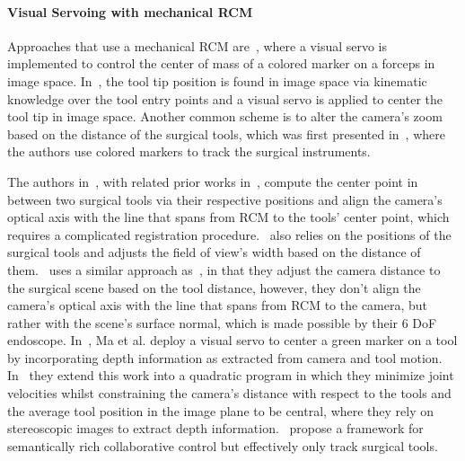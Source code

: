 \paragraph{Visual Servoing with mechanical RCM}
Approaches that use a mechanical RCM are~\cite{omote1999self}, where a visual servo is implemented to control the center of mass of a colored marker on a forceps in image space. In~\cite{agustinos2014visual, voros2007automatic}, the tool tip position is found in image space via kinematic knowledge over the tool entry points and a visual servo is applied to center the tool tip in image space. Another common scheme is to alter the camera's zoom based on the distance of the surgical tools, which was first presented in~\cite{king2013towards}, where the authors use colored markers to track the surgical instruments.

The authors in~\cite{eslamian2020development, mariani2020experimental, da2020scan}, with related prior works in~\cite{Eslamian2016TowardsTI, eslamian2017autonomous}, compute the center point in between two surgical tools via their respective positions and align the camera's optical axis with the line that spans from RCM to the tools' center point, which requires a complicated registration procedure.~\cite{yu2016automatic} also relies on the positions of the surgical tools and adjusts the field of view's width based on the distance of them.~\cite{abdelaal2020orientation} uses a similar approach as~\cite{eslamian2020development}, in that they adjust the camera distance to the surgical scene based on the tool distance, however, they don't align the camera's optical axis with the line that spans from RCM to the camera, but rather with the scene's surface normal, which is made possible by their 6 DoF endoscope. In~\cite{ma2019autonomous}, Ma et al. deploy a visual servo to center a green marker on a tool by incorporating depth information as extracted from camera and tool motion. In~\cite{ma2020visual} they extend this work into a quadratic program in which they minimize joint velocities whilst constraining the camera's distance with respect to the tools and the average tool position in the image plane to be central, where they rely on stereoscopic images to extract depth information.~\cite{gruijthuijsen2021autonomous} propose a framework for semantically rich collaborative control but effectively only track surgical tools.







